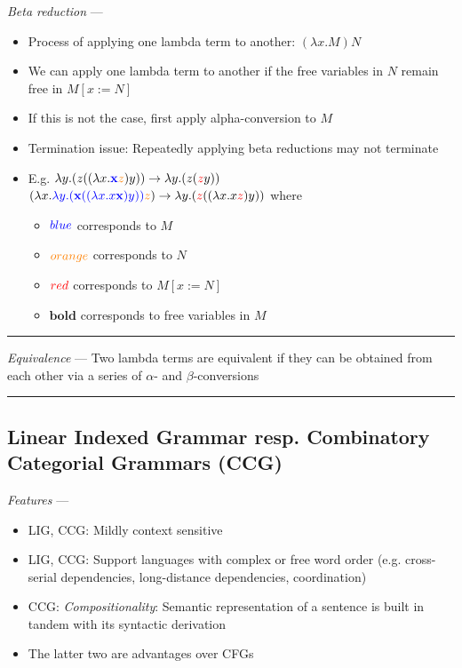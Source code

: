 \emph{Beta reduction} ---
\begin{itemize}
    \item Process of applying one lambda term to another: $(\lambda x.M)N$
    \item We can apply one lambda term to another if the free variables in $N$ remain free in $M[x := N]$
    \item If this is not the case, first apply alpha-conversion to $M$
    \item Termination issue: Repeatedly applying beta reductions may not terminate
    \item E.g. $\lambda y.(z((\lambda x.\textcolor{blue}{\mathbf{x}}\textcolor{orange}{z})y)) \to \lambda y.(z(\textcolor{red}{z}y))$\\
    $(\lambda x.\textcolor{blue}{\lambda y.(\mathbf{x}((\lambda x.x\mathbf{x})y))}\textcolor{orange}{z}) \to \lambda y.(\textcolor{red}{z}((\lambda x.x\textcolor{red}{z})y))$
    where
    \begin{itemize}
        \item $\textcolor{blue}{blue}$ corresponds to $M$
        \item $\textcolor{orange}{orange}$ corresponds to $N$
        \item $\textcolor{red}{red}$ corresponds to $M[x := N]$
        \item $\boldsymbol{bold}$ corresponds to free variables in $M$
    \end{itemize}
\end{itemize}

{\color{lightgray}\hrule height 0.001mm}

\emph{Equivalence} --- Two lambda terms are equivalent if they can be obtained from each other via a series of $\alpha$- and $\beta$-conversions

{\color{black}\hrule height 0.001mm}

\subsection*{Linear Indexed Grammar resp. Combinatory Categorial Grammars (CCG)}
\emph{Features} --- 
\begin{itemize}
    \item LIG, CCG: Mildly context sensitive
    \item LIG, CCG: Support languages with complex or free word order (e.g. cross-serial dependencies, long-distance dependencies, coordination)
    \item CCG: \emph{Compositionality}: Semantic representation of a sentence is built in tandem with its syntactic derivation
    \item The latter two are advantages over CFGs
\end{itemize}

